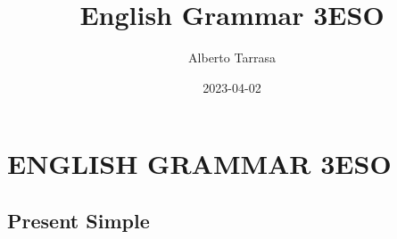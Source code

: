 \documentclass[10pt,a4paper]{article}
\title{English Grammar 3ESO}
\date{2023-04-02}
\author{Alberto Tarrasa}
\begin{document}
\section*{ENGLISH GRAMMAR 3ESO}
\subsection*{Present Simple}
\end{document}
